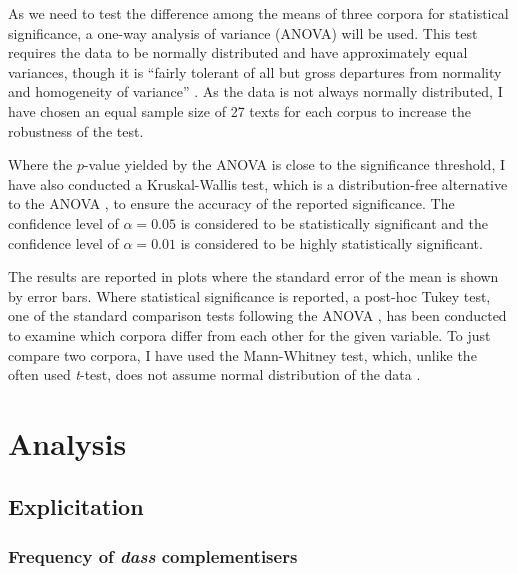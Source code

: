 \documentclass[output=paper]{LSP/langsci}
\begin{document}
As we need to test the difference among the means of three corpora for statistical significance, a one-way analysis of variance (ANOVA) will be used. This test requires the data to be normally distributed and have approximately equal variances, though it is \enquote{fairly tolerant of all but gross departures from normality and homogeneity of variance} \parencites[132]{butler85}[see also][ch. 14.1]{lowry12}. As the data is not always normally distributed, I have chosen an equal sample size of 27 texts for each corpus to increase the robustness of the test.

Where the $p$-value yielded by the ANOVA is close to the significance threshold, I have also conducted a Kruskal-Wallis test, which is a distribution-free alternative to the ANOVA \parencites[ch. 14a]{lowry12}[45]{cantos13}, to ensure the accuracy of the reported significance. The confidence level of $\alpha=0.05$ is considered to be statistically significant and the confidence level of $\alpha=0.01$ is considered to be highly statistically significant.

The results are reported in plots where the standard error of the mean is shown by error bars. Where statistical significance is reported, a post-hoc Tukey test, one of the standard comparison tests following the ANOVA \parencite[see][55]{cantos13}, has been conducted to examine which corpora differ from each other for the given variable. To just compare two corpora, I have used the Mann-Whitney test, which, unlike the often used \emph{t}-test, does not assume normal distribution of the data \parencite[104]{kilgarriff01}.

\section{Analysis}\label{bisiada:sec:anal}

\subsection{Explicitation}\label{bisiada:sec:expl}

\subsubsection{Frequency of \emph{dass} complementisers}
\end{document}
